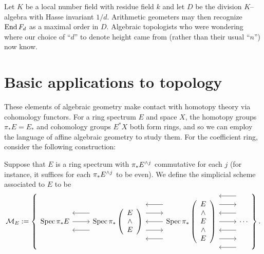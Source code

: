 \begin{remark}
Let $K$ be a local number field with residue field $k$ and let $D$ be the division $K$--algebra with Hasse invariant $1/d$.  Arithmetic geometers may then recognize $\operatorname{End} F_d$ as a maximal order in $D$.  Algebraic topologists who were wondering where our choice of ``$d$'' to denote height came from (rather than their usual ``$n$'') now know.
\end{remark}




\section{Basic applications to topology}\label{BasicApplicationsToTopology}

These elements of algebraic geometry make contact with homotopy theory via cohomology functors.  For a ring spectrum $E$ and space $X$, the homotopy groups $\pi_* E = E_*$ and cohomology groups $E^* X$ both form rings, and so we can employ the language of affine algebraic geometry to study them.  For the coefficient ring, consider the following construction:

\begin{definition}\label{RingSpToStackDefn}
Suppose that $E$ is a ring spectrum with $\pi_* E^{\wedge j}$ commutative for each $j$ (for instance, it suffices for each $\pi_* E^{\wedge j}$ to be even).  We define the simplicial scheme associated to $E$ to be \[\mathcal{M}_E := \left\{
\begin{tikzcd}
\Spec \pi_* E \arrow{r} \arrow[leftarrow,shift left=\baselineskip]{r} \arrow[leftarrow,shift right=\baselineskip]{r} & \Spec \pi_* \left( \begin{array}{c} E \\ \sm \\ E \end{array} \right) \arrow[leftarrow, shift left=(2*\baselineskip)]{r} \arrow[shift left=\baselineskip]{r} \arrow[leftarrow]{r} \arrow[shift right=\baselineskip]{r} \arrow[leftarrow, shift right=(2*\baselineskip)]{r} & \Spec \pi_* \left( \begin{array}{c} E \\ \sm \\ E \\ \sm \\ E \end{array} \right) \arrow[leftarrow, shift left=(3*\baselineskip)]{r} \arrow[shift left=(2*\baselineskip)]{r} \arrow[leftarrow, shift left=\baselineskip]{r} \arrow{r} \arrow[leftarrow, shift right=\baselineskip]{r} \arrow[shift right=(2*\baselineskip)]{r} \arrow[leftarrow, shift right=(3*\baselineskip)]{r} & \cdots
\end{tikzcd}
\right\}.\]
\end{definition}

